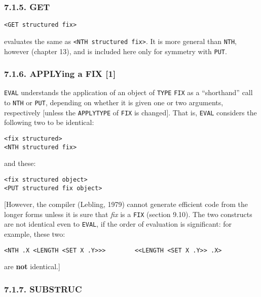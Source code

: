 \documentclass[a4paper,]{article}
\begin{document}
\subsubsection{7.1.5. GET}\label{get}

\begin{verbatim}
<GET structured fix>
\end{verbatim}

 evaluates the same as \texttt{\textless{}NTH\ structured\ fix\textgreater{}}. It is more
general than \texttt{NTH}, however (chapter 13), and is included here only for symmetry with \texttt{PUT}.

\subsubsection{7.1.6. APPLYing a FIX {[}1{]}}\label{applying-a-fix-1}

\texttt{EVAL} understands the application of an object of \texttt{TYPE} \texttt{FIX} as a ``shorthand''
call to \texttt{NTH} or \texttt{PUT}, depending on whether it is given one or two arguments, respectively {[}unless the
\texttt{APPLYTYPE} of \texttt{FIX} is changed{]}. That is, \texttt{EVAL} considers the following two to be identical:

\begin{verbatim}
<fix structured>
<NTH structured fix>
\end{verbatim}

and these:

\begin{verbatim}
<fix structured object>
<PUT structured fix object>
\end{verbatim}

{[}However, the compiler (Lebling, 1979) cannot generate efficient code from the longer forms unless it is sure that
\emph{fix} is a \texttt{FIX} (section 9.10). The two constructs are not identical even to \texttt{EVAL}, if the order of
evaluation is significant: for example, these two:

\begin{verbatim}
<NTH .X <LENGTH <SET X .Y>>>        <<LENGTH <SET X .Y>> .X>
\end{verbatim}

are \textbf{not} identical.{]}

\subsubsection{7.1.7. SUBSTRUC}\label{substruc}
\end{document}
